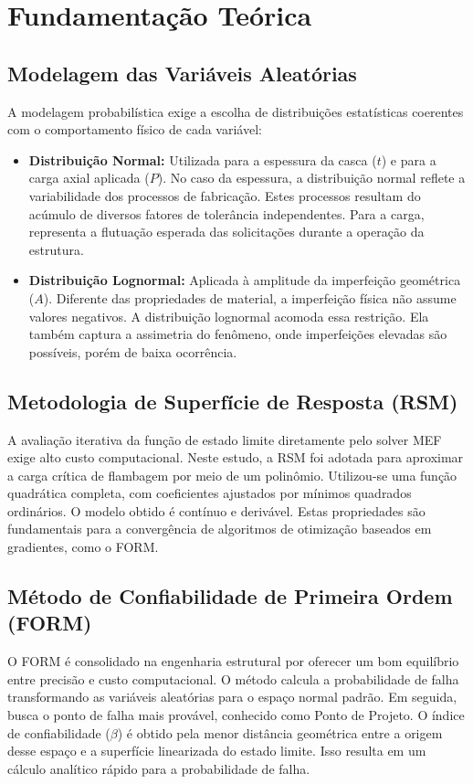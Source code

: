 \documentclass[12pt,a4paper]{article}
\begin{document}
\section{Fundamentação Teórica}

\subsection{Modelagem das Variáveis Aleatórias}
A modelagem probabilística exige a escolha de distribuições estatísticas coerentes com o comportamento físico de cada variável:
\begin{itemize}
    \item \textbf{Distribuição Normal:} Utilizada para a espessura da casca ($t$) e para a carga axial aplicada ($P$). No caso da espessura, a distribuição normal reflete a variabilidade dos processos de fabricação. Estes processos resultam do acúmulo de diversos fatores de tolerância independentes. Para a carga, representa a flutuação esperada das solicitações durante a operação da estrutura.
    \item \textbf{Distribuição Lognormal:} Aplicada à amplitude da imperfeição geométrica ($A$). Diferente das propriedades de material, a imperfeição física não assume valores negativos. A distribuição lognormal acomoda essa restrição. Ela também captura a assimetria do fenômeno, onde imperfeições elevadas são possíveis, porém de baixa ocorrência.
\end{itemize}

\subsection{Metodologia de Superfície de Resposta (RSM)}
A avaliação iterativa da função de estado limite diretamente pelo solver MEF exige alto custo computacional. Neste estudo, a RSM foi adotada para aproximar a carga crítica de flambagem por meio de um polinômio. Utilizou-se uma função quadrática completa, com coeficientes ajustados por mínimos quadrados ordinários. O modelo obtido é contínuo e derivável. Estas propriedades são fundamentais para a convergência de algoritmos de otimização baseados em gradientes, como o FORM.

\subsection{Método de Confiabilidade de Primeira Ordem (FORM)}
O FORM é consolidado na engenharia estrutural por oferecer um bom equilíbrio entre precisão e custo computacional. O método calcula a probabilidade de falha transformando as variáveis aleatórias para o espaço normal padrão. Em seguida, busca o ponto de falha mais provável, conhecido como Ponto de Projeto. O índice de confiabilidade ($\beta$) é obtido pela menor distância geométrica entre a origem desse espaço e a superfície linearizada do estado limite. Isso resulta em um cálculo analítico rápido para a probabilidade de falha.
\end{document}
